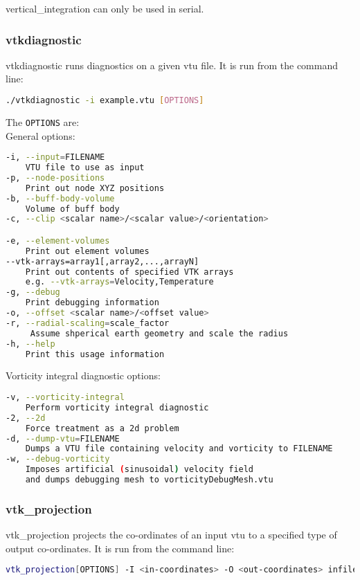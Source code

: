 vertical\_integration can only be used in serial.


\subsubsection{vtkdiagnostic}
\label{sect:vtkdiagnostic}
vtkdiagnostic runs diagnostics on a given vtu file. It is run from the command line:
\begin{lstlisting}[language = Bash]
./vtkdiagnostic -i example.vtu [OPTIONS]
\end{lstlisting}

The \lstinline[language = Bash]+OPTIONS+ are: \\
General options:
\begin{lstlisting}[language = Bash]
-i, --input=FILENAME
	VTU file to use as input
-p, --node-positions
	Print out node XYZ positions
-b, --buff-body-volume
	Volume of buff body
-c, --clip <scalar name>/<scalar value>/<orientation>

-e, --element-volumes
	Print out element volumes
--vtk-arrays=array1[,array2,...,arrayN]
	Print out contents of specified VTK arrays
	e.g. --vtk-arrays=Velocity,Temperature
-g, --debug
	Print debugging information
-o, --offset <scalar name>/<offset value>
-r, --radial-scaling=scale_factor
	 Assume shperical earth geometry and scale the radius
-h, --help
	Print this usage information
\end{lstlisting}
Vorticity integral diagnostic options:
\begin{lstlisting}[language = Bash]
-v, --vorticity-integral
	Perform vorticity integral diagnostic
-2, --2d
	Force treatment as a 2d problem
-d, --dump-vtu=FILENAME
	Dumps a VTU file containing velocity and vorticity to FILENAME
-w, --debug-vorticity
	Imposes artificial (sinusoidal) velocity field
	and dumps debugging mesh to vorticityDebugMesh.vtu
\end{lstlisting}


\subsubsection{vtk\_projection}
\label{sect:vtkprojection}
vtk\_projection projects the co-ordinates of an input vtu to a specified type of output co-ordinates. It is run from the command line:
\begin{lstlisting}[language = Bash]
vtk_projection[OPTIONS] -I <in-coordinates> -O <out-coordinates> infile.vtu
\end{lstlisting}

